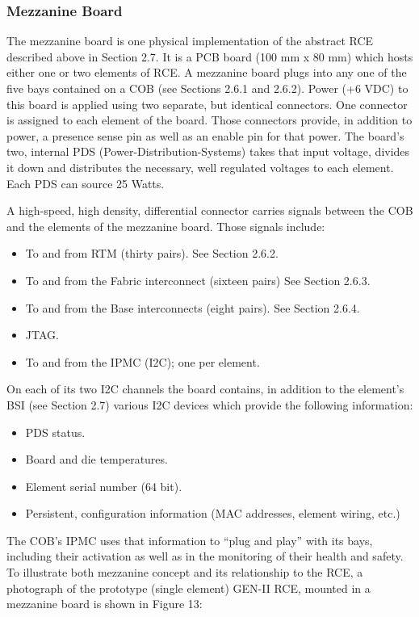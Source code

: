 \subsubsection{Mezzanine Board}

The mezzanine board is one physical implementation of the abstract RCE described above in Section 2.7. It is a PCB board (100 mm x 80 mm) which hosts either one or two elements of RCE. A mezzanine board plugs into any one of the five bays contained on a COB (see Sections 2.6.1 and 2.6.2).
Power (+6 VDC) to this board is applied using two separate, but identical connectors. One connector is assigned to each element of the board. Those connectors provide, in addition to power, a presence sense pin as well as an enable pin for that power. The board's two, internal PDS (Power-Distribution-Systems) takes that input voltage, divides it down and distributes the necessary, well regulated voltages to each element. Each PDS can source 25 Watts.

A high-speed, high density, differential connector carries signals between the COB and the elements of the mezzanine board. Those signals include:
\begin{itemize}
\item  To and from RTM (thirty pairs). See Section 2.6.2.
\item To and from the Fabric interconnect (sixteen pairs) See Section 2.6.3.
\item To and from the Base interconnects (eight pairs). See Section 2.6.4.
\item JTAG.
\item To and from the IPMC (I2C); one per element.
\end{itemize}
On each of its two I2C channels the board contains, in addition to the element's BSI (see Section 2.7) various I2C devices which provide the following information:
\begin{itemize}
\item PDS status.
\item Board and die temperatures.
\item Element serial number (64 bit).
\item Persistent, configuration information (MAC addresses, element wiring, etc.)
\end{itemize}

The COB's IPMC uses that information to “plug and play” with its bays, including their activation as well as in the monitoring of their health and safety.
To illustrate both mezzanine concept and its relationship to the RCE, a photograph of the prototype (single element) GEN-II RCE, mounted in a mezzanine board is shown in Figure 13:
